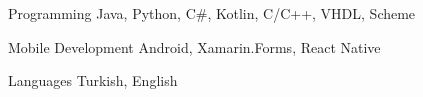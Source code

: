
\vspace*{-1.5mm}

\begin{cvskills}

  \cvskill
    {Programming} %
    {Java, Python, C\#, Kotlin, C/C++, VHDL, Scheme} %

  \cvskill
    {Mobile Development} %
    {Android, Xamarin.Forms, React Native} %

  \cvskill
    {Languages} %
    {Turkish, English} %

\end{cvskills}
